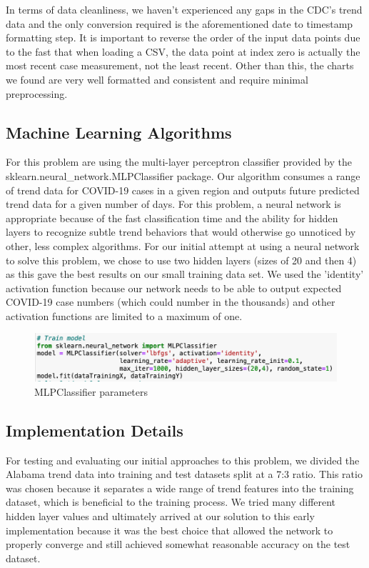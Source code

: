 \documentclass[conference]{IEEEtran}
\begin{document}
In terms of data cleanliness, we haven't experienced any gaps in the CDC's trend data and the only conversion required is the aforementioned date to timestamp formatting step. It is important to reverse the order of the input data points due to the fast that when loading a CSV, the data point at index zero is actually the most recent case measurement, not the least recent. Other than this, the charts we found are very well formatted and consistent and require minimal preprocessing.

\subsection{Machine Learning Algorithms}
For this problem are using the multi-layer perceptron classifier provided by the sklearn.neural\_network.MLPClassifier package. Our algorithm consumes a range of trend data for COVID-19 cases in a given region and outputs future predicted trend data for a given number of days. For this problem, a neural network is appropriate because of the fast classification time and the ability for hidden layers to recognize subtle trend behaviors that would otherwise go unnoticed by other, less complex algorithms. For our initial attempt at using a neural network to solve this problem, we chose to use two hidden layers (sizes of 20 and then 4) as this gave the best results on our small training data set. We used the 'identity' activation function because our network needs to be able to output expected COVID-19 case numbers (which could number in the thousands) and other activation functions are limited to a maximum of one.

\begin{figure}
    \centering
    \includegraphics[scale=0.5]{resources/code.png}
    \caption{MLPClassifier parameters}
    \label{fig:MLPClassifier_code}
\end{figure}

\subsection{Implementation Details}
For testing and evaluating our initial approaches to this problem, we divided the Alabama trend data into training and test datasets split at a 7:3 ratio. This ratio was chosen because it separates a wide range of trend features into the training dataset, which is beneficial to the training process. We tried many different hidden layer values and ultimately arrived at our solution to this early implementation because it was the best choice that allowed the network to properly converge and still achieved somewhat reasonable accuracy on the test dataset.
\end{document}
